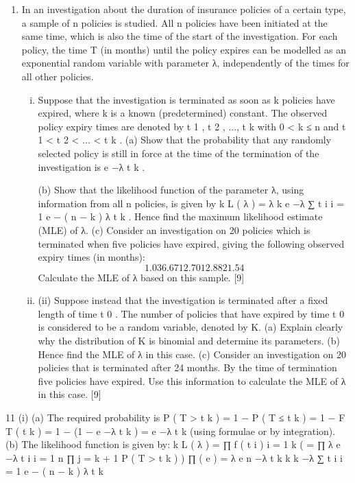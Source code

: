 \documentclass[a4paper,12pt]{article}
\begin{document}
\begin{enumerate}
\item In an investigation about the duration of insurance policies of a certain type, a sample of n policies is studied. All n policies have been initiated at the same time, which is also the time of the start of the investigation. For each policy, the time T (in months)
until the policy expires can be modelled as an exponential random variable with parameter λ, independently of the times for all other policies.
\begin{enumerate}[(i)]
\item %
Suppose that the investigation is terminated as soon as k policies have expired, where k is a known (predetermined) constant. The observed policy expiry times are denoted by t 1 , t 2 , ..., t k with 0 < k ≤ n and t 1 < t 2 < ... < t k .
(a) Show that the probability that any randomly selected policy is still in force at the time of the termination of the investigation is e −λ t k .

(b) Show that the likelihood function of the parameter λ, using information from all n policies, is given by
k
L ( λ ) = λ k e
−λ ∑ t i
i = 1
e − ( n − k ) λ t k .
Hence find the maximum likelihood estimate (MLE) of λ.
(c)
Consider an investigation on 20 policies which is terminated when five policies have expired, giving the following observed expiry times (in
months):
\[1.03 6.67 12.70 12.88 21.54\]
Calculate the MLE of λ based on this sample.
[9]
\item (ii)
Suppose instead that the investigation is terminated after a fixed length of time t 0 . The number of policies that have expired by time t 0 is considered to be a random variable, denoted by K.
(a) Explain clearly why the distribution of K is binomial and determine its
parameters.
(b) Hence find the MLE of λ in this case.
(c) Consider an investigation on 20 policies that is terminated after 24
months. By the time of termination five policies have expired.
Use this information to calculate the MLE of λ in this case.
[9]
\end{enumerate}
\end{enumerate}
\newpage
11
(i)
(a)
The required probability is
P ( T > t k ) = 1 − P ( T ≤ t k ) = 1 − F T ( t k )
= 1 − (1 − e −λ t k ) = e −λ t k (using formulae or by integration).
(b)
The likelihood function is given by:
k
L ( λ ) = ∏ f ( t i )
i = 1
k
(
= ∏ λ e −λ t i
i = 1
n
∏
j = k + 1
P ( T > t k )
) ∏ ( e ) = λ e
n
−λ t k
k
k
−λ ∑ t i
i = 1
e − ( n − k ) λ t k
\end{document}
